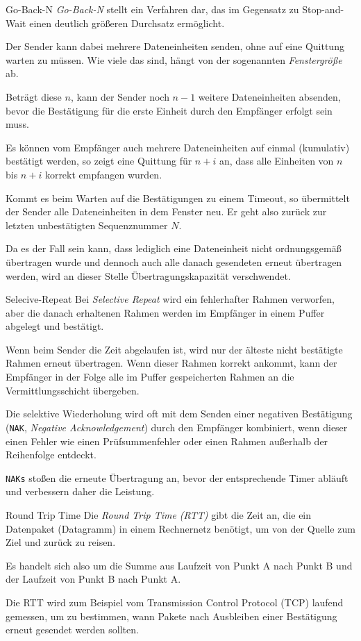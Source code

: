\begin{bonus}{Go-Back-N}
    \emph{Go-Back-N} stellt ein Verfahren dar, das im Gegensatz zu Stop-and-Wait einen deutlich größeren Durchsatz ermöglicht.

    Der Sender kann dabei mehrere Dateneinheiten senden, ohne auf eine Quittung warten zu müssen.
    Wie viele das sind, hängt von der sogenannten \emph{Fenstergröße} ab.

    Beträgt diese $n$, kann der Sender noch $n-1$ weitere Dateneinheiten absenden, bevor die Bestätigung für die erste Einheit durch den Empfänger erfolgt sein muss.

    Es können vom Empfänger auch mehrere Dateneinheiten auf einmal (kumulativ) bestätigt werden, so zeigt eine Quittung für $n+i$ an, dass alle Einheiten von $n$ bis $n+i$ korrekt empfangen wurden.

    Kommt es beim Warten auf die Bestätigungen zu einem Timeout, so übermittelt der Sender alle Dateneinheiten in dem Fenster neu.
    Er geht also zurück zur letzten unbestätigten Sequenznummer $N$.

    Da es der Fall sein kann, dass lediglich eine Dateneinheit nicht ordnungsgemäß übertragen wurde und dennoch auch alle danach gesendeten erneut übertragen werden, wird an dieser Stelle Übertragungskapazität verschwendet.
\end{bonus}

\begin{bonus}{Selecive-Repeat}
    Bei \emph{Selective Repeat}  wird ein fehlerhafter Rahmen verworfen, aber die danach erhaltenen Rahmen werden im Empfänger in einem Puffer abgelegt und bestätigt.

    Wenn beim Sender die Zeit abgelaufen ist, wird nur der älteste nicht bestätigte Rahmen erneut übertragen.
    Wenn dieser Rahmen korrekt ankommt, kann der Empfänger in der Folge alle im Puffer gespeicherten Rahmen an die Vermittlungsschicht übergeben.

    Die selektive Wiederholung wird oft mit dem Senden einer negativen Bestätigung (\texttt{NAK}, \emph{Negative Acknowledgement}) durch den Empfänger kombiniert, wenn dieser einen Fehler wie einen Prüfsummenfehler oder einen Rahmen außerhalb der Reihenfolge entdeckt.

    \texttt{NAKs} stoßen die erneute Übertragung an, bevor der entsprechende Timer abläuft und verbessern daher die Leistung.
\end{bonus}

\begin{defi}{Round Trip Time}
    Die \emph{Round Trip Time (RTT)} gibt die Zeit an, die ein Datenpaket (Datagramm) in einem Rechnernetz benötigt, um von der Quelle zum Ziel und zurück zu reisen.

    Es handelt sich also um die Summe aus Laufzeit von Punkt A nach Punkt B und der Laufzeit von Punkt B nach Punkt A.

    Die RTT wird zum Beispiel vom Transmission Control Protocol (TCP) laufend gemessen, um zu bestimmen, wann Pakete nach Ausbleiben einer Bestätigung erneut gesendet werden sollten.
\end{defi}

